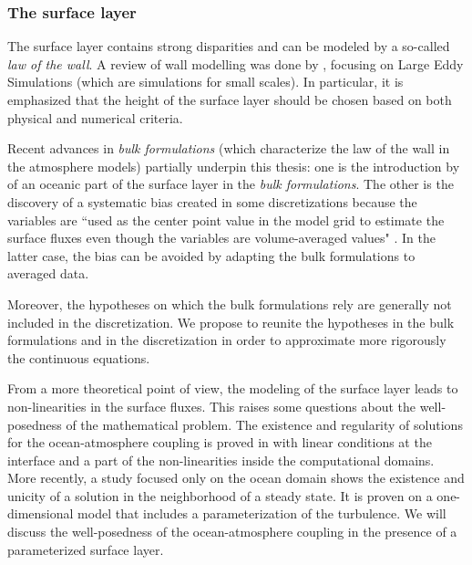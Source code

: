 \subsubsection*{The surface layer}
The surface layer contains strong disparities and can be modeled by a so-called
\textit{law of the wall}. A review of wall modelling was done by
\citep{larsson_large_2016}, focusing on Large Eddy Simulations
(which are simulations for small scales).
In particular, it is emphasized that the height of the surface layer
should be chosen based on both physical and numerical criteria.
\par
Recent advances in \textit{bulk formulations}
(which characterize the law of the wall in the atmosphere models)
partially underpin this thesis:
one is the introduction by \citep{pelletier_two-sided_2021}
of an oceanic part of the surface layer in the \textit{bulk formulations}.
The other is the discovery of a systematic bias
created in some discretizations because the variables are
``used as the center point value in the model grid
to estimate the surface fluxes even though
the variables are volume-averaged values"
\citep{nishizawa_surface_2018}.
In the latter case, the bias can be avoided by
adapting the bulk formulations to averaged
data.
\par
Moreover, the hypotheses on which the bulk formulations rely
are generally not included in the discretization.
We propose to reunite the hypotheses in the bulk formulations
and in the discretization in order to
approximate more rigorously the continuous equations.
\par
From a more theoretical point of view,
the modeling of the surface layer leads to
non-linearities in the surface fluxes. This raises
some questions about the well-posedness of the mathematical
problem.
The existence and regularity of solutions for
the ocean-atmosphere coupling is proved
in \citep{lions_mathematical_1995} with linear conditions at
the interface and a part of the non-linearities
inside the computational domains.
More recently, a study focused only
on the ocean domain \citep{chacon-rebollo_existence_2014}
shows the existence and unicity of a solution in the neighborhood
of a steady state. It is proven on a one-dimensional model that
includes a parameterization of the turbulence.
We will discuss the well-posedness of the ocean-atmosphere coupling
in the presence of a parameterized surface layer.
%
